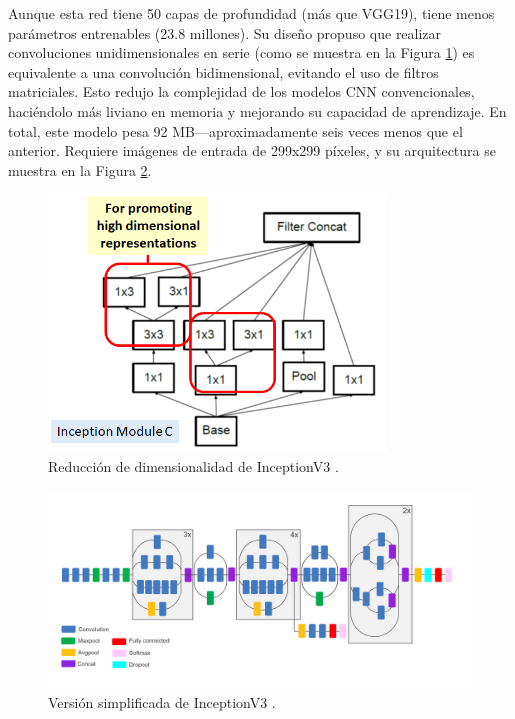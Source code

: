 Aunque esta red tiene 50 capas de profundidad (más que VGG19),
tiene menos parámetros entrenables (23.8 millones). Su diseño
propuso que realizar convoluciones unidimensionales en serie
(como se muestra en la Figura \ref{InceptionLayer}) es
equivalente a una convolución bidimensional, evitando el uso
de filtros matriciales. Esto redujo la complejidad de los
modelos CNN convencionales, haciéndolo más liviano en memoria
y mejorando su capacidad de aprendizaje. En total, este modelo
pesa 92 MB—aproximadamente seis veces menos que el anterior.
Requiere imágenes de entrada de 299x299 píxeles, y su
arquitectura se muestra en la Figura \ref{Inceptionv3}.


\begin{figure}[h!] 
    \includegraphics[width=0.8\textwidth]{images/InceptionLayer.png} 
    \centering 
    \caption{Reducción de dimensionalidad de InceptionV3 \protect\cite{modelos}.} 
    \label{InceptionLayer} 
\end{figure}

\begin{figure}[h!] 
    \includegraphics[width=1\textwidth]{images/InceptionV3.png} 
    \centering 
    \caption{Versión simplificada de InceptionV3 \protect\cite{modelos}.} 
    \label{Inceptionv3} 
\end{figure}

